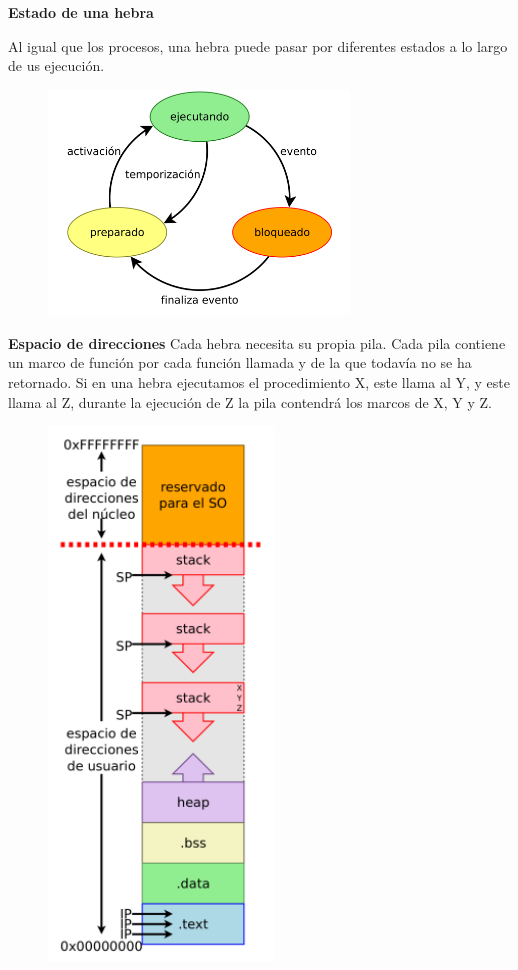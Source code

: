 \documentclass{article}
\begin{document}
\textbf{Estado de una hebra}

Al igual que los procesos, una hebra puede pasar por diferentes estados a lo largo de us ejecución.
\begin{figure}[h]
\centering
\includegraphics[scale=1,width=80mm]{estados_hebra.png}
\end{figure}

\textbf{Espacio de direcciones}
Cada hebra necesita su propia pila. Cada pila contiene un marco de función por cada función llamada y de la que todavía no se ha retornado. Si en una hebra ejecutamos el procedimiento X, este llama al Y, y este llama al Z, durante la ejecución de Z la pila contendrá los marcos de X, Y y Z.

\newpage
\begin{figure}[h]
\centering
\includegraphics[scale=1,width=60mm]{espacio_direcciones.png}
\end{figure}
\end{document}
